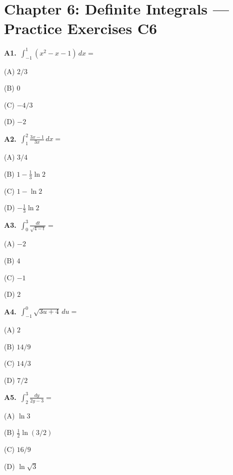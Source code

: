 \documentclass[11pt]{article}
\begin{document}
\section*{Chapter 6: Definite Integrals --- Practice Exercises C6}

\bigskip\noindent\textbf{A1.}\ $\int_{-1}^1(x^2-x-1)\,dx=$
\begin{list}{}{\setlength{\leftmargin}{3em}\setlength{\labelwidth}{2.5em}\setlength{\itemsep}{0pt}\setlength{\topsep}{2pt}}
\item[(A)] $2/3$
\item[(B)] $0$
\item[(C)] $-4/3$
\item[(D)] $-2$
\end{list}

\bigskip\noindent\textbf{A2.}\ $\int_1^2\frac{3x-1}{3x}\,dx=$
\begin{list}{}{\setlength{\leftmargin}{3em}\setlength{\labelwidth}{2.5em}\setlength{\itemsep}{0pt}\setlength{\topsep}{2pt}}
\item[(A)] $3/4$
\item[(B)] $1-\frac13\ln2$
\item[(C)] $1-\ln2$
\item[(D)] $-\frac13\ln2$
\end{list}

\bigskip\noindent\textbf{A3.}\ $\int_0^3\frac{dt}{\sqrt{4-t}}=$
\begin{list}{}{\setlength{\leftmargin}{3em}\setlength{\labelwidth}{2.5em}\setlength{\itemsep}{0pt}\setlength{\topsep}{2pt}}
\item[(A)] $-2$
\item[(B)] $4$
\item[(C)] $-1$
\item[(D)] $2$
\end{list}

\bigskip\noindent\textbf{A4.}\ $\int_{-1}^0\sqrt{3u+4}\,du=$
\begin{list}{}{\setlength{\leftmargin}{3em}\setlength{\labelwidth}{2.5em}\setlength{\itemsep}{0pt}\setlength{\topsep}{2pt}}
\item[(A)] $2$
\item[(B)] $14/9$
\item[(C)] $14/3$
\item[(D)] $7/2$
\end{list}

\bigskip\noindent\textbf{A5.}\ $\int_2^3\frac{dy}{2y-3}=$
\begin{list}{}{\setlength{\leftmargin}{3em}\setlength{\labelwidth}{2.5em}\setlength{\itemsep}{0pt}\setlength{\topsep}{2pt}}
\item[(A)] $\ln3$
\item[(B)] $\frac12\ln(3/2)$
\item[(C)] $16/9$
\item[(D)] $\ln\sqrt3$
\end{list}
\end{document}
